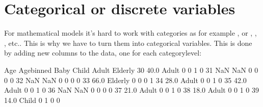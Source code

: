 \documentclass[letterpaper,10pt,english]{jupyterBook}
\begin{document}
\section{Categorical or discrete variables}
\label{\detokenize{Data_Basics:id2}}
\sphinxAtStartPar
For mathematical models it’s hard to work with categories as for example ,  or , , , etc..
This is why we have to turn them into categorical variables. This is done by adding new columns to the data, one for each category\sphinxhyphen{}level:

\begin{sphinxVerbatim}[commandchars=\\\{\}]
  \PYG{p}{[} \PYG{p}{[}\PYG{p}{]}\PYG{p}{]} 
\PYG{p}{[}\PYG{p}{[}   \PYG{p}{]}\PYG{p}{]}\PYG{p}{[}\PYG{p}{]}
\end{sphinxVerbatim}

\begin{sphinxVerbatim}[commandchars=\\\{\}]
     Age Age\PYGZus{}binned  Baby  Child  Adult  Elderly
30  40.0      Adult     0      0      1        0
31   NaN        NaN     0      0      0        0
32   NaN        NaN     0      0      0        0
33  66.0    Elderly     0      0      0        1
34  28.0      Adult     0      0      1        0
35  42.0      Adult     0      0      1        0
36   NaN        NaN     0      0      0        0
37  21.0      Adult     0      0      1        0
38  18.0      Adult     0      0      1        0
39  14.0      Child     0      1      0        0
\end{sphinxVerbatim}
\end{document}
